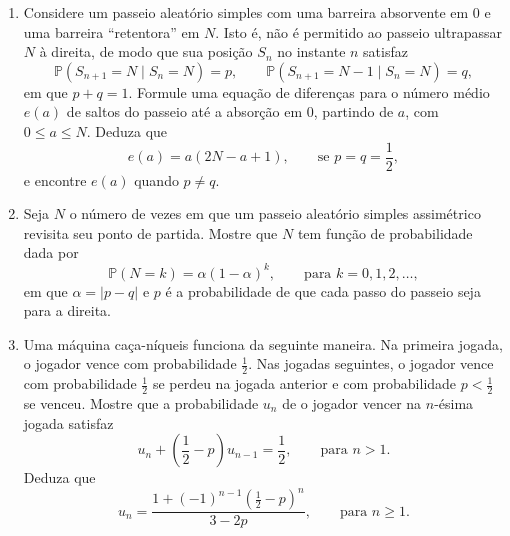 \documentclass[12pt,portuguese]{article}
\theoremstyle{definition}
\theoremstyle{plainexercise}
\theoremstyle{starredexercise}
\theoremstyle{definition}
\begin{document}
\begin{enumerate}[label={\arabic*.}]
Suponha agora que a partícula também seja absorvida sempre que atingir $N$ ou
$N+1$. Encontre a probabilidade $\pi_N(a)$ de que ela seja absorvida em $0$, em
vez de em $N$ ou $N+1$, tendo partido de $a$, em que
$0\leqslant a\leqslant N+1$. Deduza que, quando $N\to\infty$,
\[
\pi_N(a)\to
\begin{cases}
1, & \text{se } p\leqslant\frac{1}{3}, \\[0.2cm]
\theta^a, & \text{se } p>\frac{1}{3},
\end{cases}
\]
em que $\theta=\frac{1}{2}\bigl[\sqrt{1+(4q/p)}-1\bigr]$.

Deduza que, se uma moeda honesta for lançada repetidamente, a probabilidade de
que o número de caras em algum momento exceda o dobro do número de coroas é
$\frac{1}{2}(\sqrt{5}-1)$.

\item\label{prob:barreira-retentora}
Considere um passeio aleatório simples com uma barreira absorvente em $0$ e uma
barreira ``retentora'' em $N$. Isto é, não é permitido ao passeio ultrapassar
$N$ à direita, de modo que sua posição $S_n$ no instante $n$ satisfaz
\[
\mathbb{P}(S_{n+1}=N\mid S_n=N)=p,
\qquad
\mathbb{P}(S_{n+1}=N-1\mid S_n=N)=q,
\]
em que $p+q=1$. Formule uma equação de diferenças para o número médio $e(a)$ de
saltos do passeio até a absorção em $0$, partindo de $a$, com
$0\leqslant a\leqslant N$. Deduza que
\[
e(a)=a(2N-a+1), \qquad\text{se } p=q=\frac{1}{2},
\]
e encontre $e(a)$ quando $p\neq q$.

\item\label{prob:numero-revisitas-assimetrico}
Seja $N$ o número de vezes em que um passeio aleatório simples assimétrico
revisita seu ponto de partida. Mostre que $N$ tem função de probabilidade dada
por
\[
\mathbb{P}(N=k)=\alpha(1-\alpha)^k, \qquad\text{para } k=0,1,2,\ldots,
\]
em que $\alpha=|p-q|$ e $p$ é a probabilidade de que cada passo do passeio seja
para a direita.

\item\label{prob:maquina-caca-niqueis}
Uma máquina caça-níqueis funciona da seguinte maneira. Na primeira jogada, o
jogador vence com probabilidade $\tfrac{1}{2}$. Nas jogadas seguintes, o
jogador vence com probabilidade $\tfrac{1}{2}$ se perdeu na jogada anterior e
com probabilidade $p<\tfrac{1}{2}$ se venceu. Mostre que a probabilidade $u_n$
de o jogador vencer na $n$-ésima jogada satisfaz
\[
u_n+\left(\frac{1}{2}-p\right)u_{n-1}=\frac{1}{2}, \qquad\text{para } n>1.
\]
Deduza que
\[
u_n=\frac{1+(-1)^{n-1}(\tfrac{1}{2}-p)^n}{3-2p}, \qquad\text{para } n\geqslant 1.
\]


\end{enumerate}
\end{document}
